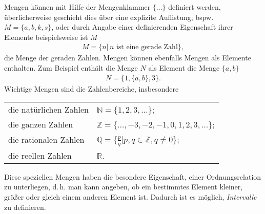 Mengen können mit Hilfe der Mengenklammer $\{\hdots\}$ definiert werden, überlicherweise geschieht dies über eine explizite Auflistung, bspw. $M=\{a,b,k,s\}$, oder durch Angabe einer definierenden Eigenschaft ihrer Elemente beispielsweise ist $M$
\begin{align}
    M = \{n |\, n \text{ ist eine gerade Zahl}\},
\end{align}
die Menge der geraden Zahlen. Mengen können ebenfalls Mengen als Elemente enthalten. Zum Beispiel enthält die Menge $N$ als Element die Menge $\{a,b\}$
\begin{align}
    N = \{1,\{a,b\}, 3\}.
\end{align}
Wichtige Mengen sind die Zahlenbereiche, insbesondere 
\begin{table}[htp]
    \centering
    \begin{tabular}{l l}
        die natürlichen Zahlen & $\mathbb{N} = \{1,2,3,\hdots\}$;\\
        die ganzen Zahlen & $\mathbb{Z} = \{\hdots,-3,-2,-1,0,1,2,3,\hdots\}$;\\
        die rationalen Zahlen & $\mathbb{Q} = \{\frac{p}{q} | p,q \in \mathbb{Z}, q\neq 0\}$;\\
        die reellen Zahlen & $\mathbb{R}$.
    \end{tabular}
\end{table}
Diese speziellen Mengen haben die besondere Eigenschaft, einer Ordnungsrelation zu unterliegen, d.\,h. man kann angeben, ob ein bestimmtes Element kleiner, größer oder gleich einem anderen Element ist. Dadurch ist es möglich, \emph{Intervalle} zu definieren.

\begin{figure}[htp]
    \centering
\end{figure}

